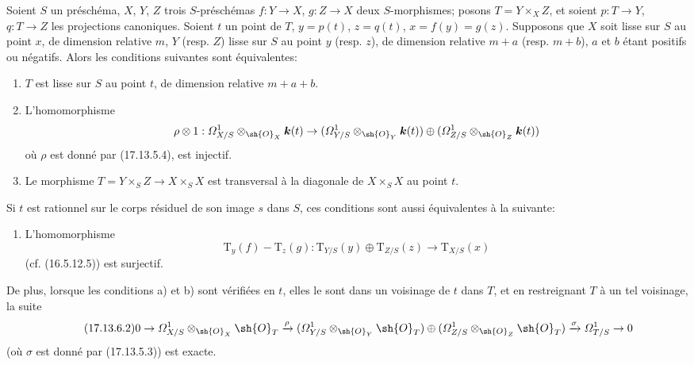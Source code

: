 \begin{corollary}[17.13.6]
Soient $S$ un préschéma, $X$, $Y$, $Z$ trois $S$-préschémas $f:Y\to X$, $g:Z\to X$ deux $S$-morphismes; posons $T=Y\times_XZ$, et soient $p:T\to Y$, $q:T\to Z$ les projections canoniques. Soient $t$ un point de $T$, $y=p(t)$, $z=q(t)$, $x=f(y)=g(z)$. Supposons que $X$ soit lisse sur $S$ au point $x$, de dimension relative $m$, $Y$ \textup{(resp. $Z$)} lisse sur $S$ au point $y$ \textup{(resp. $z$)}, de dimension relative $m+a$ \textup{(resp. $m+b$)}, $a$ et $b$ étant positifs ou négatifs. Alors les conditions suivantes sont équivalentes:
\begin{enumerate}
  \item[\textup{a)}] $T$ est lisse sur $S$ au point $t$, de dimension relative $m+a+b$.
  \item[\textup{b)}] L'homomorphisme
  \[
  \rho\otimes1:\varOmega^1_{X/S}\otimes_{\sh{O}_X}\boldsymbol{k}(t)\to
  (\varOmega^1_{Y/S}\otimes_{\sh{O}_Y}\boldsymbol{k}(t))\oplus
  (\varOmega^1_{Z/S}\otimes_{\sh{O}_Z}\boldsymbol{k}(t))
  \]
  où $\rho$ est donné par \textup{(17.13.5.4)}, est injectif.
  \item[\textup{c)}] Le morphisme $T=Y\times_SZ\to X\times_SX$ est transversal à la diagonale de $X\times_SX$ au point $t$.
\end{enumerate}

Si $t$ est rationnel sur le corps résiduel de son image $s$ dans $S$, ces conditions sont aussi équivalentes à la suivante:
\begin{enumerate}
  \item[\textup{b$'$)}] L'homomorphisme
  \[
  \label{IV.17.13.6.1}
  \tag{17.13.6.1}
  \mathrm{T}_y(f)-\mathrm{T}_z(g):\mathrm{T}_{Y/S}(y)\oplus\mathrm{T}_{Z/S}(z)\to\mathrm{T}_{X/S}(x)
  \]
  \textup{(cf. (16.5.12.5))} est surjectif.
\end{enumerate}

De plus, lorsque les conditions \textup{a)} et \textup{b)} sont vérifiées en $t$, elles le sont dans un voisinage de $t$ dans $T$, et en restreignant $T$ à un tel voisinage, la suite
\[
\label{IV.17.13.6.2}
\tag{17.13.6.2}
0\to\varOmega^1_{X/S}\otimes_{\sh{O}_X}\sh{O}_T\xrightarrow{\rho}
(\varOmega^1_{Y/S}\otimes_{\sh{O}_Y}\sh{O}_T)\oplus
(\varOmega^1_{Z/S}\otimes_{\sh{O}_Z}\sh{O}_T)
\xrightarrow{\sigma}\varOmega^1_{T/S}\to0
\]
\textup{(}où $\sigma$ est donné par \textup{(17.13.5.3))} est exacte.
\end{corollary}

